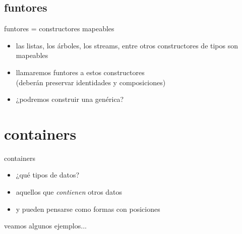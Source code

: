 \documentclass[9pt]{beamer}
\begin{document}
\subsection{funtores}

\begin{frame}{funtores = constructores mapeables}
  \begin{itemize}
  \item las listas, los árboles, los streams, entre otros constructores de tipos son \alert{mapeables}
  \item llamaremos \alert{funtores} a estos constructores\\ {\small(deberán preservar identidades y composiciones)} 
  \item ¿podremos construir una  genérica?
  \end{itemize}
\end{frame}


\section{containers}

\begin{frame}{containers}
  \begin{itemize}
  \item[]¿qué tipos de datos?
  \item[]aquellos que \emph{contienen} otros datos
  \item[] y pueden pensarse como \alert{formas con posiciones}
  \end{itemize}
  \vspace{2cm}
  \begin{flushright}veamos algunos ejemplos...\end{flushright}
\end{frame}
\end{document}
